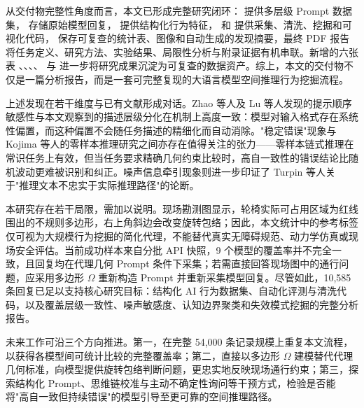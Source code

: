 从交付物完整性角度而言，本文已形成完整研究闭环： 提供多层级 Prompt 数据集， 存储原始模型回复， 提供结构化行为特征， 和  提供采集、清洗、挖掘和可视化代码， 保存可复查的统计表、图像和自动生成的发现摘要，最终 PDF 报告将任务定义、研究方法、实验结果、局限性分析与附录证据有机串联。新增的六张表 、、、、 与  进一步将研究成果沉淀为可复查的数据资产。综上，本文的交付物不仅是一篇分析报告，而是一套可完整复现的大语言模型空间推理行为挖掘流程。

上述发现在若干维度与已有文献形成对话。Zhao 等人\cite{zhao2021calibrate}及 Lu 等人\cite{lu2022fantastically}发现的提示顺序敏感性与本文观察到的描述层级分化在机制上高度一致：模型对输入格式存在系统性偏置，而这种偏置不会随任务描述的精细化而自动消除。"稳定错误"现象与 Kojima 等人\cite{kojima2022large}的零样本推理研究之间亦存在值得关注的张力——零样本链式推理在常识任务上有效，但当任务要求精确几何约束比较时，高自一致性的错误结论比随机波动更难被识别和纠正。噪声信息牵引现象则进一步印证了 Turpin 等人\cite{turpin2023language}关于"推理文本不忠实于实际推理路径"的论断。

本研究存在若干局限，需加以说明。现场勘测图显示，轮椅实际可占用区域为红线围出的不规则多边形，右上角斜边会改变旋转包络；因此，本文统计中的参考标签仅可视为大规模行为挖掘的简化代理，不能替代真实无障碍规范、动力学仿真或现场安全评估。当前成功样本来自分批 API 快照，9 个模型的覆盖率并不完全一致，且回复均在代理几何 Prompt 条件下采集；若需直接回答现场图中的通行问题，应采用多边形 $\Omega$ 重新构造 Prompt 并重新采集模型回复。尽管如此，10{,}585 条回复已足以支持核心研究目标：结构化 AI 行为数据集、自动化评测与清洗代码，以及覆盖层级一致性、噪声敏感度、认知边界聚类和失效模式挖掘的完整分析报告。

未来工作可沿三个方向推进。第一，在完整 54{,}000 条记录规模上重复本文流程，以获得各模型间可统计比较的完整覆盖率；第二，直接以多边形 $\Omega$ 建模替代代理几何标准，向模型提供旋转包络判断问题，更忠实地反映现场通行约束；第三，探索结构化 Prompt、思维链校准与主动不确定性询问等干预方式，检验是否能将"高自一致但持续错误"的模型引导至更可靠的空间推理路径。
